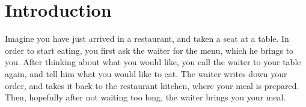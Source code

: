 \section{Introduction}
Imagine you have just arrived in a restaurant, and taken a seat at a table. In order to start eating, you first ask the waiter for the menu, which he brings to you. After thinking about what you would like, you call the waiter to your table again, and tell him what you would like to eat. The waiter writes down your order, and takes it back to the restaurant kitchen, where your meal is prepared. Then, hopefully after not waiting too long, the waiter brings you your meal. 